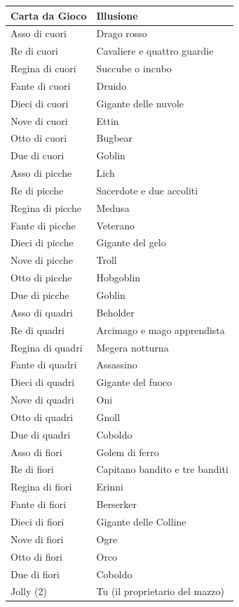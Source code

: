 \begin{multicols}{2}
\noindent\begin{tabularx}{\linewidth}{ll}
	\toprule
\rowcolor{gray!20}\textbf{Carta da Gioco} & \textbf{Illusione} \\
\toprule
Asso di cuori & Drago rosso \\
\rowcolor{gray!20}Re di cuori & Cavaliere e quattro guardie \\
Regina di cuori & Succube o incubo \\
\rowcolor{gray!20}Fante di cuori & Druido \\
Dieci di cuori & Gigante delle nuvole \\
\rowcolor{gray!20}Nove di cuori & Ettin \\
Otto di cuori & Bugbear \\
\rowcolor{gray!20}Due di cuori & Goblin \\
Asso di picche & Lich \\
\rowcolor{gray!20}Re di picche & Sacerdote e due accoliti \\
Regina di picche & Medusa \\
\rowcolor{gray!20}Fante di picche & Veterano \\
Dieci di picche & Gigante del gelo \\
\rowcolor{gray!20}Nove di picche & Troll \\
Otto di picche & Hobgoblin \\
\rowcolor{gray!20}Due di picche & Goblin \\
Asso di quadri & Beholder \\
\rowcolor{gray!20}Re di quadri & Arcimago e mago apprendista \\
Regina di quadri & Megera notturna \\
\rowcolor{gray!20}Fante di quadri & Assassino \\
Dieci di quadri & Gigante del fuoco \\
\rowcolor{gray!20}Nove di quadri & Oni \\
Otto di quadri & Gnoll \\
\rowcolor{gray!20}Due di quadri & Coboldo \\
Asso di fiori & Golem di ferro \\
\rowcolor{gray!20}Re di fiori & Capitano bandito e tre banditi \\
Regina di fiori & Erinni \\
\rowcolor{gray!20}Fante di fiori & Berserker \\
Dieci di fiori & Gigante delle Colline \\
\rowcolor{gray!20}Nove di fiori & Ogre \\
Otto di fiori & Orco \\
\rowcolor{gray!20}Due di fiori & Coboldo \\
Jolly (2) & Tu (il proprietario del mazzo) \\
\end{tabularx}


\end{multicols}
